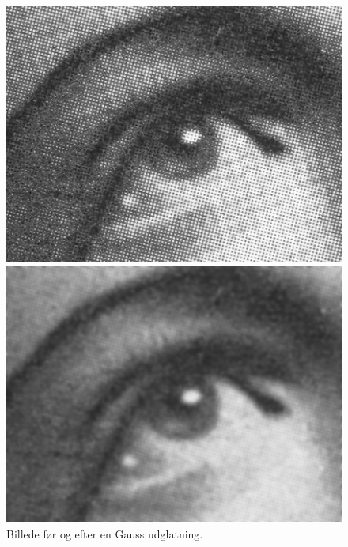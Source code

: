 \begin{figure}[H]
	\begin{minipage}[b]{0.5\linewidth}
		\centering
		\includegraphics[scale=1.5]{files/premethod/img/gauss_pre.png}
	\end{minipage}
	\hspace{0.5cm}
	\begin{minipage}[b]{0.5\linewidth}
		\centering
		\includegraphics[scale=1.5]{files/premethod/img/gauss_post.png}
	\end{minipage}
	\caption{Billede før og efter en Gauss udglatning.\label{fig:premethod_gauss}}
\end{figure}

